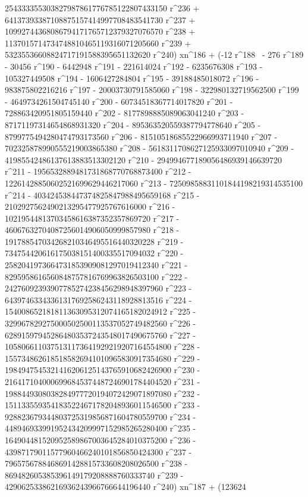        254333355303827987861776785122807433150 r^236 + 
       64137393387108875157414997708483541730 r^237 + 
       10992744368086794171765712379327076570 r^238 + 
       1137015714734748810465119316071205660 r^239 + 
       53235536608824717191588395651132620 r^240) xn^186 + (-12 r^188 \
- 276 r^189 - 30456 r^190 - 6442948 r^191 - 221614024 r^192 - 
       6235676308 r^193 - 105327449508 r^194 - 1606427284804 r^195 - 
       39188485018072 r^196 - 983875802216216 r^197 - 
       20003730791585060 r^198 - 322980132719562500 r^199 - 
       4649734261504745140 r^200 - 60734518367714017820 r^201 - 
       728863420951805159440 r^202 - 8177898885089063041240 r^203 - 
       87171197314654868931320 r^204 - 
       895363520559387794778640 r^205 - 
       8799775494280474793173560 r^206 - 
       81510518685522966993711940 r^207 - 
       702325878990555219003865380 r^208 - 
       5618311708627125933097010940 r^209 - 
       41985542486137613883513302120 r^210 - 
       294994677189056486939146639720 r^211 - 
       1956532889481731868770768873400 r^212 - 
       12261428850602521699629446217060 r^213 - 
       72509858831101844198219314535100 r^214 - 
       403424538447374825847988495659168 r^215 - 
       2102927562490213295477925767616000 r^216 - 
       10219544813703458616387352357869720 r^217 - 
       46067632704087256014906050999857980 r^218 - 
       191788547034268210346495516440320228 r^219 - 
       734754420616175038151400335517094032 r^220 - 
       2582041973664731853909081297019412340 r^221 - 
       8295958616560848757816769963826503100 r^222 - 
       24276092393907785274238456298948397960 r^223 - 
       64397463343361317692586243118928813516 r^224 - 
       154008652181811363095312074165182024912 r^225 - 
       329967829275000502500113537052749482560 r^226 - 
       628915979452864803537243548017490675760 r^227 - 
       1058066110375131173641929219207164554800 r^228 - 
       1557348626185185826941010965830917354680 r^229 - 
       1984947545321416206125143765910682426900 r^230 - 
       2164171040006996845374487246901784404520 r^231 - 
       1988449308038284977720194072429071897080 r^232 - 
       1511335593541835224671782048936011546500 r^233 - 
       928823679344803725319856871604780559700 r^234 - 
       448946933991952434209997152985265280400 r^235 - 
       164904481520952589867003645284010375200 r^236 - 
       43987179011577960466240101856850424300 r^237 - 
       7965756788468691428815733608208026500 r^238 - 
       869482605385396149179208888760333740 r^239 - 
       42906253386216936243966766644196440 r^240) xn^187 + (123624 \
